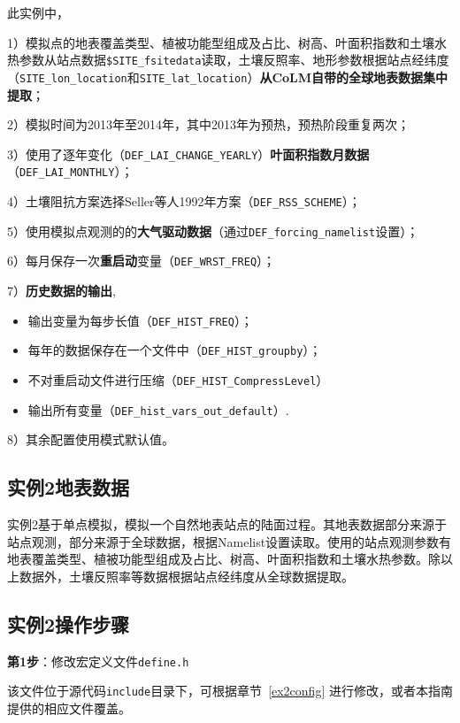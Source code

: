 此实例中，\par
1）模拟点的地表覆盖类型、植被功能型组成及占比、树高、叶面积指数和土壤水热参数从站点数据\texttt{\$SITE\_fsitedata}读取，土壤反照率、地形参数根据站点经纬度（\texttt{SITE\_lon\_location}和\texttt{SITE\_lat\_location}）\textbf{从CoLM自带的全球地表数据集中提取}；\par
2）模拟时间为2013年至2014年，其中2013年为预热，预热阶段重复两次；\par
3）使用了逐年变化（\texttt{DEF\_LAI\_CHANGE\_YEARLY}）\textbf{叶面积指数月数据}\\ （\texttt{DEF\_LAI\_MONTHLY}）；\par
4）土壤阻抗方案选择Seller等人1992年方案（\texttt{DEF\_RSS\_SCHEME}）；\par
5）使用模拟点观测的的\textbf{大气驱动数据}（通过\texttt{DEF\_forcing\_namelist}设置）；\par
6）每月保存一次\textbf{重启动}变量（\texttt{DEF\_WRST\_FREQ}）；\par
7）\textbf{历史数据的输出},
\begin{itemize}[nosep,leftmargin=4em]
    \item 输出变量为每步长值（\texttt{DEF\_HIST\_FREQ}）；
    \item 每年的数据保存在一个文件中（\texttt{DEF\_HIST\_groupby}）；
    \item 不对重启动文件进行压缩（\texttt{DEF\_HIST\_CompressLevel}）
    \item 输出所有变量（\texttt{DEF\_hist\_vars\_out\_default}）.
\end{itemize} \par
8）其余配置使用模式默认值。

\subsection{实例2地表数据}

实例2基于单点模拟，模拟一个自然地表站点的陆面过程。其地表数据部分来源于站点观测，部分来源于全球数据，根据Namelist设置读取。使用的站点观测参数有地表覆盖类型、植被功能型组成及占比、树高、叶面积指数和土壤水热参数。除以上数据外，土壤反照率等数据根据站点经纬度从全球数据提取。

\subsection{实例2操作步骤}

\textbf{第1步}：修改宏定义文件\texttt{define.h}

该文件位于源代码\texttt{include}目录下，可根据章节~\ref{ex2config} 进行修改，或者本指南提供的相应文件覆盖。

